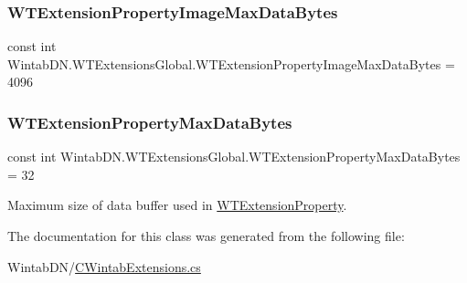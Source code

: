 \subsubsection{\texorpdfstring{W\+T\+Extension\+Property\+Image\+Max\+Data\+Bytes}{WTExtensionPropertyImageMaxDataBytes}}
{\footnotesize\ttfamily const int Wintab\+D\+N.\+W\+T\+Extensions\+Global.\+W\+T\+Extension\+Property\+Image\+Max\+Data\+Bytes = 4096}

\mbox{\label{class_wintab_d_n_1_1_w_t_extensions_global_a7d018d3547cfd0f49ee66064ca0bdd36}} 
\subsubsection{\texorpdfstring{W\+T\+Extension\+Property\+Max\+Data\+Bytes}{WTExtensionPropertyMaxDataBytes}}
{\footnotesize\ttfamily const int Wintab\+D\+N.\+W\+T\+Extensions\+Global.\+W\+T\+Extension\+Property\+Max\+Data\+Bytes = 32}



Maximum size of data buffer used in \mbox{\hyperlink{struct_wintab_d_n_1_1_w_t_extension_property}{W\+T\+Extension\+Property}}. 



The documentation for this class was generated from the following file\+:\begin{DoxyCompactItemize}
\item 
Wintab\+D\+N/\mbox{\hyperlink{_c_wintab_extensions_8cs}{C\+Wintab\+Extensions.\+cs}}\end{DoxyCompactItemize}
